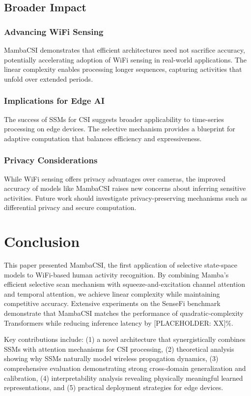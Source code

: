 \documentclass[journal]{IEEEtran}
\begin{document}
\subsection{Broader Impact}

\subsubsection{Advancing WiFi Sensing}
MambaCSI demonstrates that efficient architectures need not sacrifice accuracy, potentially accelerating adoption of WiFi sensing in real-world applications. The linear complexity enables processing longer sequences, capturing activities that unfold over extended periods.

\subsubsection{Implications for Edge AI}
The success of SSMs for CSI suggests broader applicability to time-series processing on edge devices. The selective mechanism provides a blueprint for adaptive computation that balances efficiency and expressiveness.

\subsubsection{Privacy Considerations}
While WiFi sensing offers privacy advantages over cameras, the improved accuracy of models like MambaCSI raises new concerns about inferring sensitive activities. Future work should investigate privacy-preserving mechanisms such as differential privacy and secure computation.

\section{Conclusion}

This paper presented MambaCSI, the first application of selective state-space models to WiFi-based human activity recognition. By combining Mamba's efficient selective scan mechanism with squeeze-and-excitation channel attention and temporal attention, we achieve linear complexity while maintaining competitive accuracy. Extensive experiments on the SenseFi benchmark demonstrate that MambaCSI matches the performance of quadratic-complexity Transformers while reducing inference latency by [PLACEHOLDER: XX]\%.

Key contributions include: (1) a novel architecture that synergistically combines SSMs with attention mechanisms for CSI processing, (2) theoretical analysis showing why SSMs naturally model wireless propagation dynamics, (3) comprehensive evaluation demonstrating strong cross-domain generalization and calibration, (4) interpretability analysis revealing physically meaningful learned representations, and (5) practical deployment strategies for edge devices.
\end{document}
